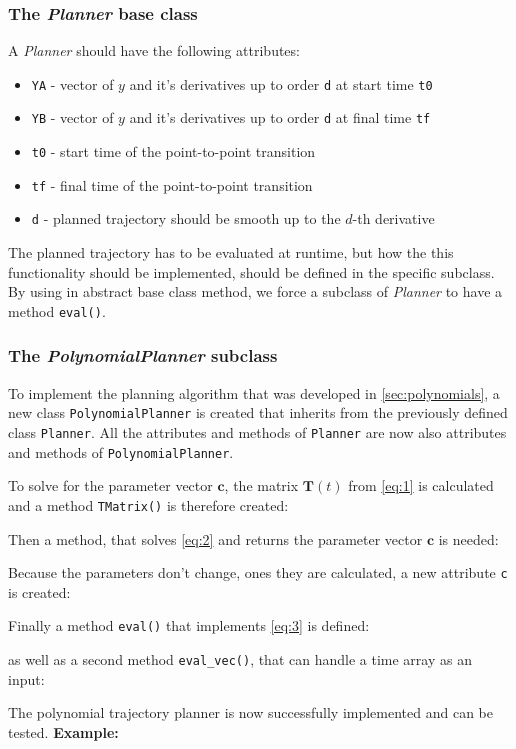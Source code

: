 \documentclass[a4paper,11pt,headings=standardclasses,parskip=half]{scrartcl}
\newcommand{\listcode}[3]{}
\newcommand{\listcodeplanner}[2]{\listcode{#1}{#2}{../sim/Planner.py}}
\begin{document}
\subsubsection{The \emph{Planner} base class}
A \emph{Planner} should have the following attributes:
\begin{itemize}
	\item[] \texttt{YA} - vector of $y$ and it's derivatives up to order \texttt{d} at start time \texttt{t0}
	\item[] \texttt{YB} - vector of $y$ and it's derivatives up to order \texttt{d} at final time \texttt{tf}
	\item[] \texttt{t0} - start time of the point-to-point transition
	\item[] \texttt{tf} - final time of the point-to-point transition
	\item[] \texttt{d} - planned trajectory should be smooth up to the $d$-th derivative
\end{itemize}
The planned trajectory has to be evaluated at runtime, but how the this functionality should be implemented, should be defined in the specific subclass. By using in abstract base class method, we force a subclass of \emph{Planner} to have a method \texttt{eval()}.
\listcodeplanner{2}{27}
\subsubsection{The \emph{PolynomialPlanner} subclass}
\label{sec:polynomialplanner}
To implement the planning algorithm that was developed in \autoref{sec:polynomials}, a new class \texttt{PolynomialPlanner} is created that inherits from the previously defined class \texttt{Planner}. All the attributes and methods of \texttt{Planner} are now also attributes and methods of \texttt{PolynomialPlanner}.
\listcodeplanner{30}{36}
To solve for the parameter vector $\mathbf{c}$, the matrix $\mathbf{T}(t)$ from \eqref{eq:1} is calculated and a method \texttt{TMatrix()} is therefore created:
\listcodeplanner{76}{97}
Then a method, that solves \eqref{eq:2} and returns the parameter vector $\mathbf{c}$ is needed:
\listcodeplanner{100}{119}
Because the parameters don't change, ones they are calculated, a new attribute \texttt{c} is created:
\listcodeplanner{38}{40}
Finally a method \texttt{eval()} that implements \eqref{eq:3} is defined:
\listcodeplanner{42}{57}
as well as a second method \texttt{eval\_vec()}, that can handle a time array as an input:
\listcodeplanner{60}{73}
The polynomial trajectory planner is now successfully implemented and can be tested.
\textbf{Example:}
\end{document}
